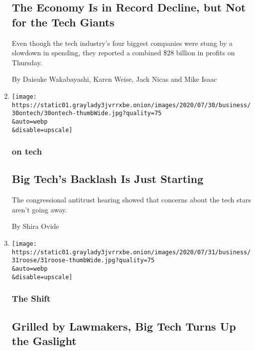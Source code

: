 \begin{enumerate}
{  \subsection{The Economy Is in Record Decline, but Not for the Tech
  Giants}\label{the-economy-is-in-record-decline-but-not-for-the-tech-giants}}

  Even though the tech industry's four biggest companies were stung by a
  slowdown in spending, they reported a combined \$28 billion in profits
  on Thursday.

  By Daisuke Wakabayashi, Karen Weise, Jack Nicas and Mike Isaac
\item
  \href{/2020/07/30/technology/big-tech-backlash.html}{}

  \texttt{[image: https://static01.graylady3jvrrxbe.onion/images/2020/07/30/business/30ontech/30ontech-thumbWide.jpg?quality=75\\\&auto=webp\\\&disable=upscale]}

  \hypertarget{on-tech-1}{%
  \subsubsection{on tech}\label{on-tech-1}}

  \hypertarget{big-techs-backlash-is-just-starting}{%
  \subsection{Big Tech's Backlash Is Just
  Starting}\label{big-techs-backlash-is-just-starting}}

  The congressional antitrust hearing showed that concerns about the
  tech stars aren't going away.

  By Shira Ovide
\item
  \href{/2020/07/30/technology/big-tech-ceos.html}{}

  \texttt{[image: https://static01.graylady3jvrrxbe.onion/images/2020/07/31/business/31roose/31roose-thumbWide.jpg?quality=75\\\&auto=webp\\\&disable=upscale]}

  \hypertarget{the-shift}{%
  \subsubsection{The Shift}\label{the-shift}}

  \hypertarget{grilled-by-lawmakers-big-tech-turns-up-the-gaslight}{%
  \subsection{Grilled by Lawmakers, Big Tech Turns Up the
  Gaslight}\label{grilled-by-lawmakers-big-tech-turns-up-the-gaslight}}


\end{enumerate}
